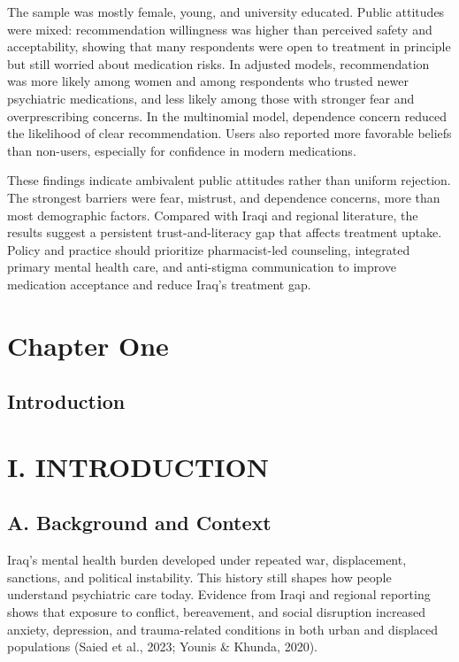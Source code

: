 The sample was mostly female, young, and university educated. Public
attitudes were mixed: recommendation willingness was higher than
perceived safety and acceptability, showing that many respondents were
open to treatment in principle but still worried about medication risks.
In adjusted models, recommendation was more likely among women and among
respondents who trusted newer psychiatric medications, and less likely
among those with stronger fear and overprescribing concerns. In the
multinomial model, dependence concern reduced the likelihood of clear
recommendation. Users also reported more favorable beliefs than
non-users, especially for confidence in modern medications.

These findings indicate ambivalent public attitudes rather than uniform
rejection. The strongest barriers were fear, mistrust, and dependence
concerns, more than most demographic factors. Compared with Iraqi and
regional literature, the results suggest a persistent trust-and-literacy
gap that affects treatment uptake. Policy and practice should prioritize
pharmacist-led counseling, integrated primary mental health care, and
anti-stigma communication to improve medication acceptance and reduce
Iraq's treatment gap.

\section{Chapter One}\label{chapter-one}

\subsection{Introduction}\label{introduction}

\section{I. INTRODUCTION}\label{i.-introduction}

\subsection{A. Background and Context}\label{a.-background-and-context}

Iraq's mental health burden developed under repeated war, displacement,
sanctions, and political instability. This history still shapes how
people understand psychiatric care today. Evidence from Iraqi and
regional reporting shows that exposure to conflict, bereavement, and
social disruption increased anxiety, depression, and trauma-related
conditions in both urban and displaced populations (Saied et al., 2023;
Younis \& Khunda, 2020).

